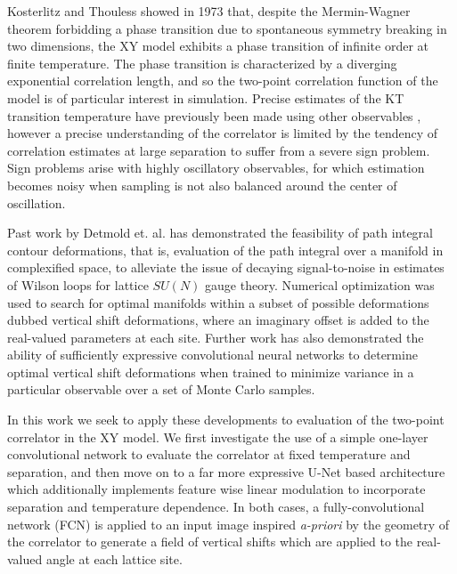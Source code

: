 \documentclass[12pt]{article}
\begin{document}
Kosterlitz and Thouless \cite{KT} showed in 1973 that, despite the Mermin-Wagner theorem forbidding a phase transition due to spontaneous symmetry breaking
in two dimensions, the XY model exhibits a phase transition of infinite order at finite temperature. The phase transition is characterized by a diverging
exponential correlation length, and so the two-point correlation function of the model is of particular interest in simulation. Precise estimates of the KT transition
temperature have previously been made using other observables \cite{Hasenbusch_2005}, however a precise understanding of the correlator is limited by
the tendency of correlation estimates at large separation to suffer from a severe sign problem. Sign problems arise with highly oscillatory observables, for which
estimation becomes noisy when sampling is not also balanced around the center of oscillation.

Past work by Detmold et. al. \cite{Detmold_2021} has demonstrated the feasibility of path integral contour deformations, that is, evaluation
of the path integral over a manifold in complexified space, to alleviate the issue of decaying signal-to-noise in estimates of Wilson loops for lattice $SU(N)$ gauge theory.
Numerical optimization was used to search for optimal manifolds within a subset of possible deformations dubbed vertical shift deformations, where an imaginary offset is added to the
real-valued parameters at each site. Further work \cite{detmold2023signaltonoiseimprovementneuralnetwork} has also demonstrated the ability of sufficiently expressive convolutional neural networks
to determine optimal vertical shift deformations when trained to minimize variance in a particular observable over a set of Monte Carlo samples.

In this work we seek to apply these developments to evaluation of the two-point correlator in the XY model. We first investigate the use of a simple one-layer
convolutional network to evaluate the correlator at fixed temperature and separation, and then move on to a far more expressive U-Net \cite{ronneberger2015unetconvolutionalnetworksbiomedical}
based architecture which additionally implements feature wise linear modulation \cite{perez2017filmvisualreasoninggeneral} to incorporate separation and temperature dependence. In both cases,
a fully-convolutional network (FCN) is applied to an input image inspired \textit{a-priori} by the geometry of the correlator to generate a field of vertical shifts which are applied to
the real-valued angle at each lattice site.
\end{document}
